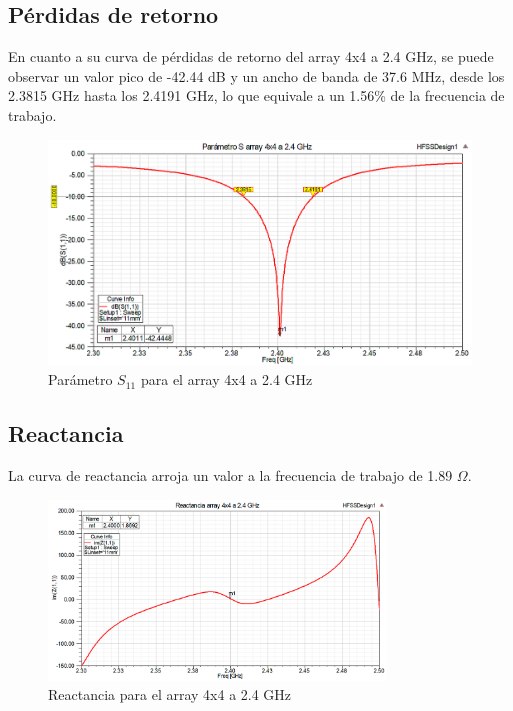 \subsection{Pérdidas de retorno}
\par En cuanto a su curva de pérdidas de retorno del array 4x4 a 2.4 GHz, se puede observar un valor pico de -42.44 dB y un ancho de banda de 37.6 MHz, desde los 2.3815 GHz hasta los 2.4191 GHz, lo que equivale a un 1.56\% de la frecuencia de trabajo.
\\
\begin{figure}[H]
    \centering
        \includegraphics[width=\textwidth]{archivos/analisis/4x41/1}
        \caption{Parámetro $S_{11}$ para el array 4x4 a 2.4 GHz}
        \label{fig:s4x41}
\end{figure}

\newpage
\subsection{Reactancia}
\par La curva de reactancia arroja un valor a la frecuencia de trabajo de 1.89 $\Omega$. 
\\
\begin{figure}[H]
    \centering
        \includegraphics[width=0.8\textwidth]{archivos/analisis/4x41/2}
        \caption{Reactancia para el array 4x4 a 2.4 GHz}
        \label{fig:react4x41}
\end{figure}

